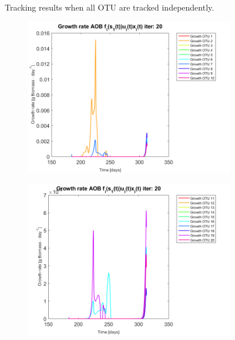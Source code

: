 \documentclass[3p,times]{article}
\begin{document}
\begin{figure}[h]
\begin{subfigure}{0.45 \textwidth}
	\end{subfigure}
	\caption{Tracking results when all OTU are tracked independently.}
	\label{OTU abudance all}
\end{figure}


\begin{figure}[h]
	\centering
	\begin{subfigure}{0.45 \textwidth}
		\includegraphics[width =\textwidth]{Application//200407_iter_20_growth_control_AOB_plot_1}
	\end{subfigure}
	\begin{subfigure}{0.45 \textwidth}
		\includegraphics[width =\textwidth]{Application//200407_iter_20_growth_control_AOB_plot_2}
	\end{subfigure}

\end{figure}
\end{document}

